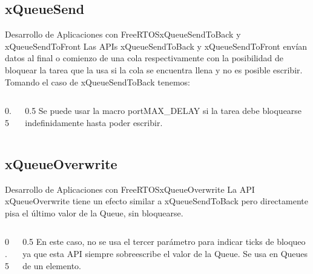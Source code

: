 \documentclass[aspectratio=169, xcolor=dvipsnames]{beamer}
\begin{document}
\subsection{xQueueSend}
\begin{frame}{Desarrollo de Aplicaciones con FreeRTOS}{xQueueSendToBack y xQueueSendToFront}
Las APIs \textcolor{myblue}{xQueueSendToBack} y \textcolor{myblue}{xQueueSendToFront} envían datos al final o comienzo de una cola respectivamente con la posibilidad de bloquear la tarea que la usa si la cola se encuentra llena y no es posible escribir. Tomando el caso de xQueueSendToBack tenemos:\newline
\begin{columns}
\begin{column}{0.5\textwidth}

\end{column}
\begin{column}{0.5\textwidth}
Se puede usar la macro \textcolor{myblue}{portMAX\_DELAY} si la tarea debe bloquearse indefinidamente hasta poder escribir.
\end{column}
\end{columns}
\end{frame}

\subsection{xQueueOverwrite}
\begin{frame}{Desarrollo de Aplicaciones con FreeRTOS}{xQueueOverwrite}
La API \textcolor{myblue}{xQueueOverwrite} tiene un efecto similar a xQueueSendToBack pero directamente pisa el último valor de la Queue, sin bloquearse.\newline
\begin{columns}
\begin{column}{0.5\textwidth}

\end{column}
\begin{column}{0.5\textwidth}
\newline
En este caso, no se usa el tercer parámetro para indicar ticks de bloqueo ya que esta API siempre sobreescribe el valor de la Queue. Se usa en Queues de un elemento.
\end{column}
\end{columns}
\end{frame}
\end{document}
